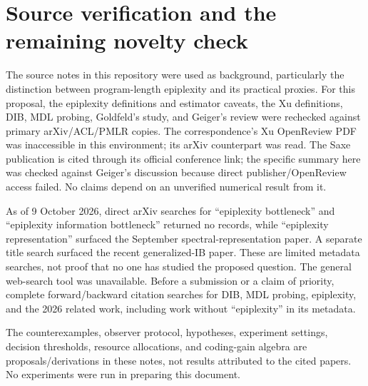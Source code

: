\documentclass[11pt,a4paper]{article}
\begin{document}
\section{Source verification and the remaining novelty check}
The source notes in this repository were used as background, particularly the distinction between program-length epiplexity and its practical proxies. For this proposal, the epiplexity definitions and estimator caveats, the Xu definitions, DIB, MDL probing, Goldfeld's study, and Geiger's review were rechecked against primary arXiv/ACL/PMLR copies. The correspondence's Xu OpenReview PDF was inaccessible in this environment; its arXiv counterpart was read. The Saxe publication is cited through its official conference link; the specific summary here was checked against Geiger's discussion because direct publisher/OpenReview access failed. No claims depend on an unverified numerical result from it.

As of 9 October 2026, direct arXiv searches for ``epiplexity bottleneck'' and ``epiplexity information bottleneck'' returned no records, while ``epiplexity representation'' surfaced the September spectral-representation paper. A separate title search surfaced the recent generalized-IB paper. These are limited metadata searches, not proof that no one has studied the proposed question. The general web-search tool was unavailable. Before a submission or a claim of priority, complete forward/backward citation searches for DIB, MDL probing, epiplexity, and the 2026 related work, including work without ``epiplexity'' in its metadata.

The counterexamples, observer protocol, hypotheses, experiment settings, decision thresholds, resource allocations, and coding-gain algebra are proposals/derivations in these notes, not results attributed to the cited papers. No experiments were run in preparing this document.


\begingroup
{}

\endgroup
\end{document}
